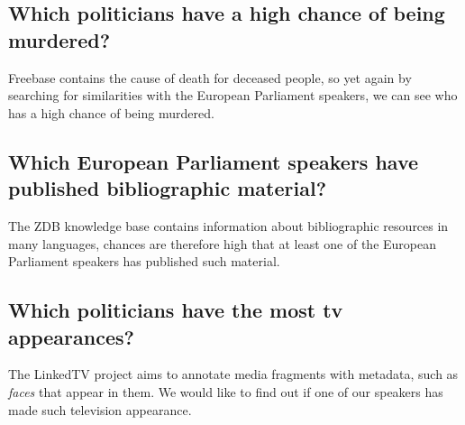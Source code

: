 \documentclass[11pt,a4paper]{article}
\begin{document}
\subsection{Which politicians have a high chance of being murdered?}

Freebase contains the cause of death for deceased people, so yet again by searching for similarities with the European Parliament speakers, we can see who has a high chance of being murdered.

\subsection{Which European Parliament speakers have published bibliographic material?}

The ZDB knowledge base contains information about bibliographic resources in many languages, chances are therefore high that at least one of the European Parliament speakers has published such material.

\subsection{Which politicians have the most tv appearances?}

The LinkedTV project aims to annotate media fragments with metadata, such as \emph{faces} that appear in them. We would like to find out if one of our speakers has made such television appearance.
\end{document}
